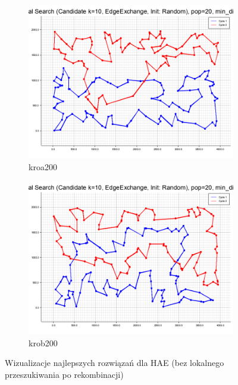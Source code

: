 \documentclass[12pt,a4paper]{article}
\begin{document}
\begin{figure}[H]
\begin{adjustwidth}{-1cm}{-1cm}
    \centering
    \begin{subfigure}[b]{0.5\textwidth}
        \centering
        \includegraphics[width=\textwidth]{figures/kroa200_HAE_Base_Local_Search_Candidate_k_10_EdgeExchange_Init_Random__pop_20_min_diff_40_.png}
        \caption{kroa200}
    \end{subfigure}%
    \hfill
    \begin{subfigure}[b]{0.5\textwidth}
        \centering
        \includegraphics[width=\textwidth]{figures/krob200_HAE_Base_Local_Search_Candidate_k_10_EdgeExchange_Init_Random__pop_20_min_diff_40_.png}
        \caption{krob200}
    \end{subfigure}
    \caption{Wizualizacje najlepszych rozwiązań dla HAE (bez lokalnego przeszukiwania po rekombinacji)}
    \label{fig:hae_nols}
\end{adjustwidth}
\end{figure}
\end{document}
